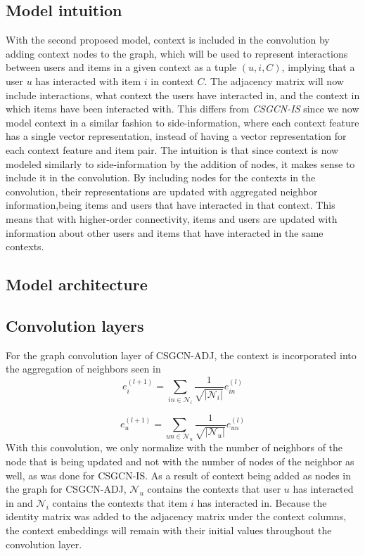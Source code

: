 \subsection{Model intuition}\label{subsec:csgcn_adj_intuition}
With the second proposed model, context is included in the convolution by adding context nodes to the graph, which will be used to represent interactions between users and items in a given context as a tuple $(u,i,C)$, implying that a user $u$ has interacted with item $i$ in context $C$.
The adjacency matrix will now include interactions, what context the users have interacted in, and the context in which items have been interacted with.
This differs from \textit{CSGCN-IS} since we now model context in a similar fashion to side-information, where each context feature has a single vector representation, instead of having a vector representation for each context feature and item pair.
The intuition is that since context is now modeled similarly to side-information by the addition of nodes, it makes sense to include it in the convolution.
By including nodes for the contexts in the convolution, their representations are updated with aggregated neighbor information,being items and users that have interacted in that context.
This means that with higher-order connectivity, items and users are updated with information about other users and items that have interacted in the same contexts.

\subsection{Model architecture}\label{subsec:csgcn_adj_architecture}

\subsection{Convolution layers}\label{subsec:csgcn_adj_conv_layer}
For the graph convolution layer of CSGCN-ADJ, the context is incorporated into the aggregation of neighbors seen in 
\begin{equation}\label{eq:csgcn_adj_gc_layer_item}
    e_{i}^{(l+1)}=\sum_{in\in \mathcal{N}_{i}}\frac{1}{\sqrt{|\mathcal{N}_{i}|} }e_{in}^{(l)}
\end{equation}

\begin{equation}\label{eq:csgcn_adj_gc_layer_user}
     e_{u}^{(l+1)}=\sum_{un\in \mathcal{N}_{u}}\frac{1}{ \sqrt{|\mathcal{N}_{u}|}}e_{un}^{(l)}
\end{equation}
With this convolution, we only normalize with the number of neighbors of the node that is being updated and not with the number of nodes of the neighbor as well, as was done for CSGCN-IS.
As a result of context being added as nodes in the graph for CSGCN-ADJ, $\mathcal{N}_{u}$ contains the contexts that user $u$ has interacted in and $\mathcal{N}_{i}$ contains the contexts that item $i$ has interacted in.
Because the identity matrix was added to the adjacency matrix under the context columns, the context embeddings will remain with their initial values throughout the convolution layer.

